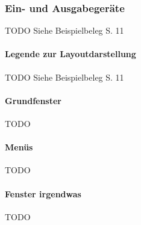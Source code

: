 \subsubsection{Ein- und Ausgabegeräte}
TODO Siehe Beispielbeleg S. 11

\paragraph{Legende zur Layoutdarstellung}
TODO Siehe Beispielbeleg S. 11

\paragraph{Grundfenster}
TODO

\paragraph{Menüs}
TODO

\paragraph{Fenster irgendwas}
TODO